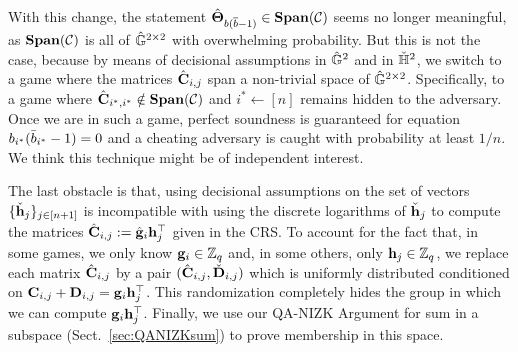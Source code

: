 With this change, the statement ${\hat{\mathbf{{\Theta}}}}_{b(\overline{b}-1)}\in\mathbf{Span}(\mathcal{C})$ seems no longer meaningful, as $\mathbf{Span}(\mathcal{C})$ is all of ${\hat{\mathbb{G}}}^{2\times 2}$ with overwhelming probability. But this is not the case, because by means of decisional assumptions in ${\hat{\mathbb{G}}}^2$ and in ${\check{\mathbb{H}}}^2$, we switch to a game where the matrices
$\hat{\mathbf{{C}}}_{i,j}$ span a non-trivial space of ${\hat{\mathbb{G}}}^{2 \times 2}$. Specifically, to a game where $\hat{\mathbf{{C}}}_{i^*,i^*}\notin\mathbf{Span}(\mathcal{C})$ and $i^*\gets[n]$ remains hidden to the adversary. Once we are in such a game, perfect soundness is guaranteed for equation $b_{i^*}(\bar{b}_{i^*}-1)=0$ and a cheating adversary is caught with probability at least $1/n$. We think this technique might be of independent interest.

The last obstacle is that, 
  using decisional assumptions on the set of vectors 
  $\{\check{\mathbf{h}}_{j}\}_{j\in[n+1]}$ is incompatible with using the discrete logarithms of $\check{\mathbf{h}}_j$ to compute the matrices $\hat{\mathbf{{C}}}_{i,j}:=\hat{\mathbf{g}}_i \mathbf{h}_j^{\top}$ given in the CRS. 
To account for the fact that, in some games,
  we only know $\mathbf{g}_i \in \mathbb{Z}_q$ and, in some others,
  only $\mathbf{h}_j \in \mathbb{Z}_q$, we replace each matrix 
  $\hat{\mathbf{{C}}}_{i,j}$ by a pair 
  $(\hat{\mathbf{{C}}}_{i,j},\check{\mathbf{{D}}}_{i,j})$ which is uniformly 
  distributed conditioned on 
  $\mathbf{{C}}_{i,j}+\mathbf{{D}}_{i,j}=\mathbf{g}_i \mathbf{h}_j^{\top}$.
This randomization completely hides the group in which we can compute 
  $\mathbf{g}_i \mathbf{h}_j^{\top}$. 
  Finally, we use our QA-NIZK Argument for sum in a subspace (Sect.\ \ref{sec:QANIZKsum}) to prove membership in this space.

